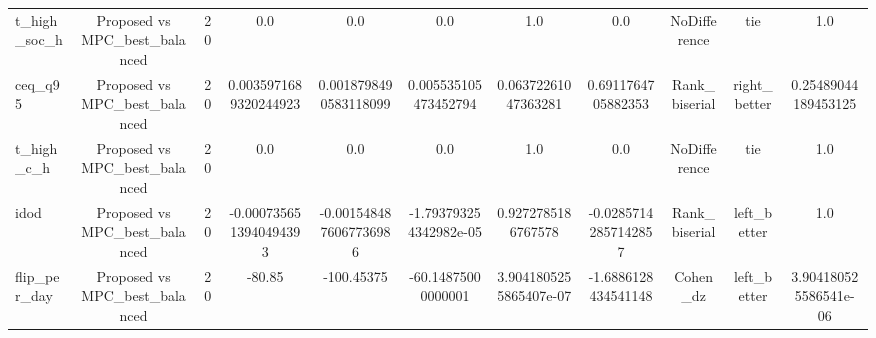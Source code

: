 \begin{table}[t]
\begin{tabular}{lcccccccccc}
t\_high\_soc\_h & Proposed vs MPC\_best\_balanced & 20 & 0.0 & 0.0 & 0.0 & 1.0 & 0.0 & NoDifference & tie & 1.0 \\
ceq\_q95 & Proposed vs MPC\_best\_balanced & 20 & 0.0035971689320244923 & 0.0018798490583118099 & 0.005535105473452794 & 0.06372261047363281 & 0.6911764705882353 & Rank\_biserial & right\_better & 0.25489044189453125 \\
t\_high\_c\_h & Proposed vs MPC\_best\_balanced & 20 & 0.0 & 0.0 & 0.0 & 1.0 & 0.0 & NoDifference & tie & 1.0 \\
idod & Proposed vs MPC\_best\_balanced & 20 & -0.0007356513940494393 & -0.0015484876067736986 & -1.793793254342982e-05 & 0.9272785186767578 & -0.02857142857142857 & Rank\_biserial & left\_better & 1.0 \\
flip\_per\_day & Proposed vs MPC\_best\_balanced & 20 & -80.85 & -100.45375 & -60.14875000000001 & 3.9041805255865407e-07 & -1.6886128434541148 & Cohen\_dz & left\_better & 3.904180525586541e-06 \\
\bottomrule
\end{tabular}
\end{table}